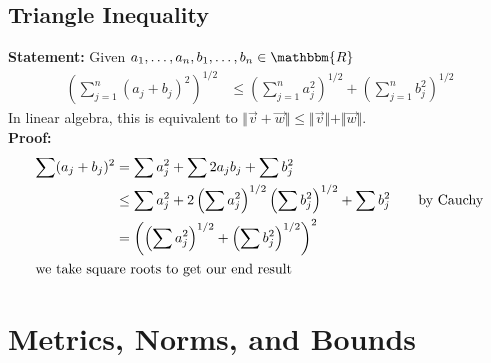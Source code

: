 \documentclass[10pt]{extarticle}
\newcommand{\R}{\mathbbm{R}}
\begin{document}
    \subsection{Triangle Inequality}%
    \textbf{Statement:} Given $a_1,\dots,a_n,b_1,\dots,b_n\in\R$
    \begin{align*}
      \left(\sum_{j=1}^{n}(a_j + b_j)^2\right)^{1/2} &\leq \left(\sum_{j=1}^{n}a_j^2\right)^{1/2} + \left(\sum_{j=1}^{n}b_j^2\right)^{1/2}
    \end{align*}
    In linear algebra, this is equivalent to $\Vert\vec{v} + \vec{w}\Vert \leq \Vert\vec{v}\Vert + \Vert\vec{w}\Vert$.\\

    \textbf{Proof:}
    \begin{align*}
      \sum (a_j + b_j)^2 &= \sum a_j^2 + \sum 2a_jb_j + \sum b_j^2\\
                         &\leq \sum a_j^2 + 2\left(\sum a_j^2\right)^{1/2}\left(\sum b_j^2\right)^{1/2} + \sum b_j^2\tag*{by Cauchy}\\
                         &= \left(\left(\sum a_j^2\right)^{1/2} + \left(\sum b_j^2\right)^{1/2} \right)^2\\
                         \shortintertext{we take square roots to get our end result}
    \end{align*}
  \section{Metrics, Norms, and Bounds}%
\end{document}
